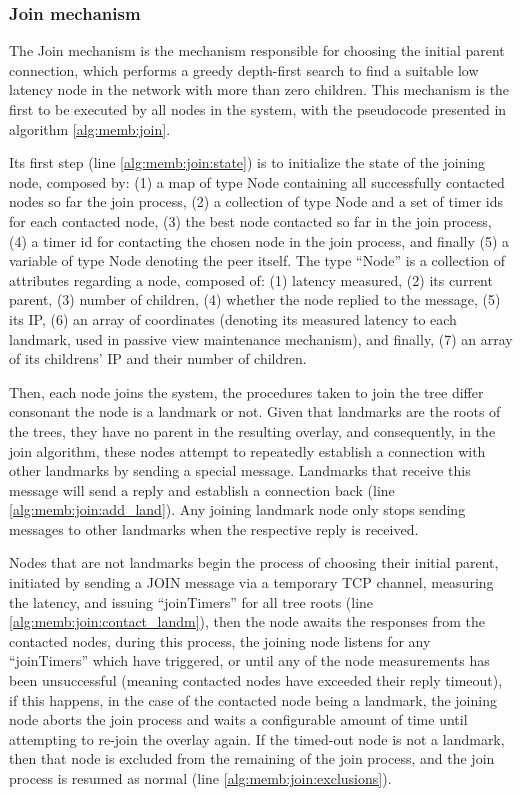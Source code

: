 \subsubsection{Join mechanism} \label{sec:overlay_network:join}

The Join mechanism is the mechanism responsible for choosing the initial parent connection, which performs a greedy depth-first search to find a suitable low latency node in the network with more than zero children. This mechanism is the first to be executed by all nodes in the system, with the pseudocode presented in algorithm \ref{alg:memb:join}. 



Its first step (line \ref{alg:memb:join:state}) is to initialize the state of the joining node, composed by: (1) a map of type Node containing all successfully contacted nodes so far the join process, (2) a collection of type Node and a set of timer ids for each contacted node, (3) the best node contacted so far in the join process, (4) a timer id for contacting the chosen node in the join process, and finally (5) a variable of type Node denoting the peer itself. The type ``Node'' is a collection of attributes regarding a node, composed of: (1) latency measured, (2) its current parent, (3) number of children, (4) whether the node replied to the message, (5) its IP, (6) an array of coordinates (denoting its measured latency to each landmark, used in passive view maintenance mechanism), and finally, (7) an array of its childrens' IP and their number of children.
 
Then, each node joins the system, the procedures taken to join the tree differ consonant the node is a landmark or not. Given that landmarks are the roots of the trees, they have no parent in the resulting overlay, and consequently, in the join algorithm, these nodes attempt to repeatedly establish a connection with other landmarks by sending a special message. Landmarks that receive this message will send a reply and establish a connection back (line \ref{alg:memb:join:add_land}). Any joining landmark node only stops sending messages to other landmarks when the respective reply is received.

Nodes that are not landmarks begin the process of choosing their initial parent, initiated by sending a JOIN message via a temporary TCP channel, measuring the latency, and issuing ``joinTimers'' for all tree roots (line \ref{alg:memb:join:contact_landm}), then the node awaits the responses from the contacted nodes, during this process, the joining node listens for any ``joinTimers'' which have triggered, or until any of the node measurements has been unsuccessful (meaning contacted nodes have exceeded their reply timeout), if this happens, in the case of the contacted node being a landmark, the joining node aborts the join process and waits a configurable amount of time until attempting to re-join the overlay again. If the timed-out node is not a landmark, then that node is excluded from the remaining of the join process, and the join process is resumed as normal (line \ref{alg:memb:join:exclusions}).

